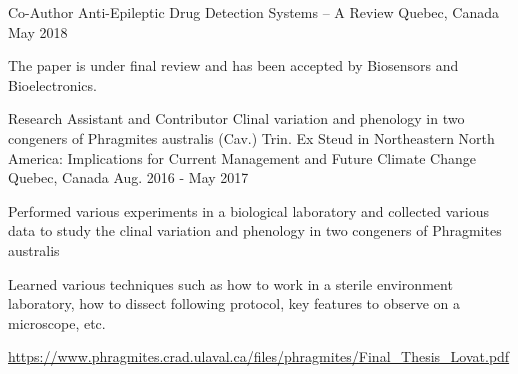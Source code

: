 \begin{cventries}
  \cventry
    {Co-Author}
    {Anti-Epileptic Drug Detection Systems – A Review}
    {Quebec, Canada}
    {May 2018}
    {
      \begin{cvitems}
        \item {The paper is under final review and has been accepted by Biosensors and Bioelectronics.}
      \end{cvitems}
    }
        \cventry
    {Research Assistant
and Contributor}
    {Clinal variation and phenology in two congeners of Phragmites australis (Cav.) Trin. Ex Steud in Northeastern North America: Implications for Current Management and Future Climate Change}
    {Quebec, Canada}
    {Aug. 2016 - May 2017}
    {
      \begin{cvitems}
        \item {Performed various experiments in a biological laboratory and collected various data to study the clinal variation and phenology in two congeners of Phragmites australis}
        \item {Learned various techniques such as how to work in a sterile environment laboratory, how to dissect following protocol, key features to observe on a microscope, etc. }
        \item{\url{https://www.phragmites.crad.ulaval.ca/files/phragmites/Final_Thesis_Lovat.pdf}}
      \end{cvitems}
    }
 
\end{cventries}
